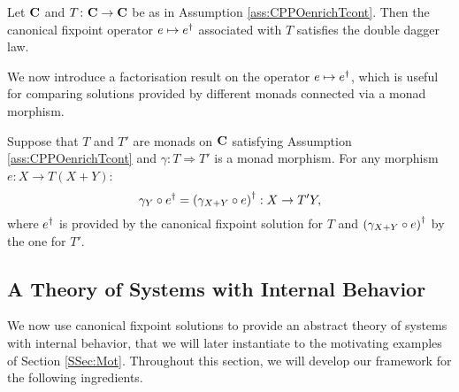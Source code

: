 \documentclass[oribibl,envcountsame,envcountsect,runningheads]{llncs}
\renewcommand{\>}{\rangle}
\def\:{\colon}
\begin{document}
\begin{corollary}\label{cor:cansolElgot} Let $\mathbf{C}$ and $T \: \C \to \C$ be as in Assumption \ref{ass:CPPOenrichTcont}. Then the canonical fixpoint operator $e \mapsto {e}^\dag$ associated with $T$ satisfies the double dagger law.
\end{corollary}

We now introduce a factorisation result on the operator $e \mapsto {e}^\dag$, which is useful for comparing solutions provided by different monads connected via a monad morphism.
\newcommand{\propfact}{Suppose that $T$ and $T'$ are monads on $\C$ satisfying Assumption \ref{ass:CPPOenrichTcont} and $\gamma \: T \Rightarrow T'$ is a monad morphism. For any morphism $e : X \to T(X+Y)$:
\[ \gamma_Y \circ \cansol e = \cansol {(\gamma_{X+Y} \circ e)} : X \to T' Y,\]
where $\cansol e$ is provided by the canonical fixpoint solution for $T$ and $\cansol {(\gamma_{X+Y} \circ e)}$ by the one for $T'$.}
\begin{proposition} \label{prop:factorizationLemma}
\propfact
\end{proposition}
\subsection{A Theory of Systems with Internal Behavior}

We now use canonical fixpoint solutions to provide an abstract theory of systems with internal behavior, that we will later instantiate to the motivating examples of Section \ref{SSec:Mot}. Throughout this section, we will develop our framework for the following ingredients.
\end{document}
